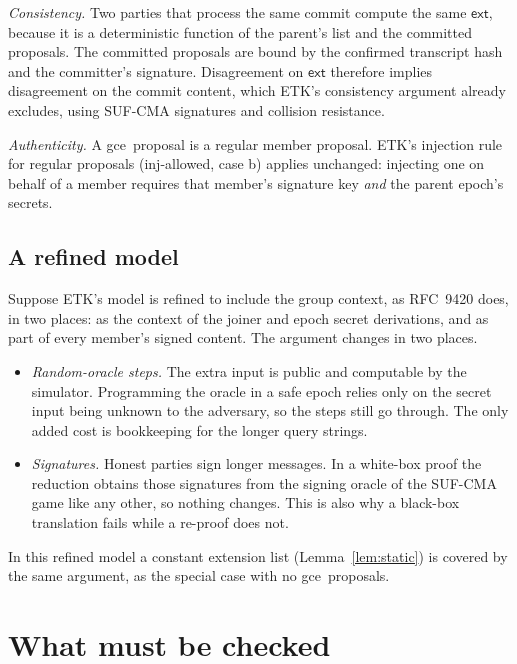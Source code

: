 \documentclass[aps,prx,reprint,superscriptaddress,nofootinbib,floatfix]{revtex4-2}
\theoremstyle{remark}
\newcommand{\gce}{\textsf{gce}}
\newcommand{\ext}{\mathsf{ext}}
\begin{document}
\emph{Consistency.} Two parties that process the same commit compute the same $\ext$, because it is a deterministic function of the parent's list and the committed proposals. The committed proposals are bound by the confirmed transcript hash and the committer's signature. Disagreement on $\ext$ therefore implies disagreement on the commit content, which ETK's consistency argument already excludes, using SUF-CMA signatures and collision resistance.

\emph{Authenticity.} A \gce\ proposal is a regular member proposal. ETK's injection rule for regular proposals (inj-allowed, case b) applies unchanged: injecting one on behalf of a member requires that member's signature key \emph{and} the parent epoch's secrets.

\subsection{A refined model}\label{sec:refined}

Suppose ETK's model is refined to include the group context, as RFC~9420 does, in two places: as the context of the joiner and epoch secret derivations, and as part of every member's signed content. The argument changes in two places.
\begin{itemize}
\item \emph{Random-oracle steps.} The extra input is public and computable by the simulator. Programming the oracle in a safe epoch relies only on the secret input being unknown to the adversary, so the steps still go through. The only added cost is bookkeeping for the longer query strings.
\item \emph{Signatures.} Honest parties sign longer messages. In a white-box proof the reduction obtains those signatures from the signing oracle of the SUF-CMA game like any other, so nothing changes. This is also why a black-box translation fails while a re-proof does not.
\end{itemize}
In this refined model a constant extension list (Lemma~\ref{lem:static}) is covered by the same argument, as the special case with no \gce\ proposals.

\section{What must be checked}
\end{document}
